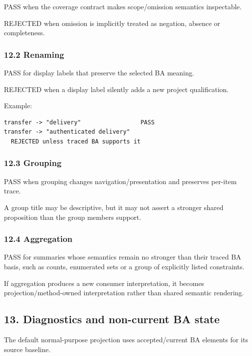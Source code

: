 \documentclass[11pt,a4paper]{article}
\begin{document}
PASS when the coverage contract makes scope/omission semantics inspectable.

REJECTED when omission is implicitly treated as negation, absence or completeness.

\subsubsection{12.2 Renaming}\label{122-renaming}

PASS for display labels that preserve the selected BA meaning.

REJECTED when a display label silently adds a new project qualification.

Example:

\begin{verbatim}
transfer -> "delivery"                 PASS
transfer -> "authenticated delivery"
  REJECTED unless traced BA supports it
\end{verbatim}

\subsubsection{12.3 Grouping}\label{123-grouping}

PASS when grouping changes navigation/presentation and preserves per-item trace.

A group title may be descriptive, but it may not assert a stronger shared proposition than the group members support.

\subsubsection{12.4 Aggregation}\label{124-aggregation}

PASS for summaries whose semantics remain no stronger than their traced BA basis, such as counts, enumerated sets or a group of explicitly listed constraints.

If aggregation produces a new consumer interpretation, it becomes projection/method-owned interpretation rather than shared semantic rendering.

\subsection{13. Diagnostics and non-current BA state}\label{13-diagnostics-and-non-current-ba-state}

The default normal-purpose projection uses accepted/current BA elements for its source baseline.
\end{document}
